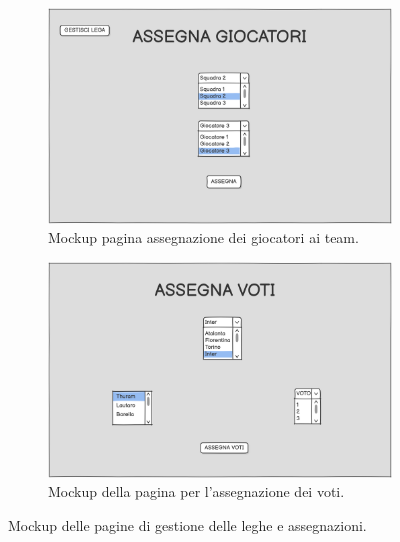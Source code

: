 \begin{figure}[H]
    \begin{subfigure}[b]{0.49\textwidth}
        \centering
        \includegraphics[width=\textwidth]{Resources/Mockups/AssegnaGiocatori.png}
        \caption{Mockup pagina assegnazione dei giocatori ai team.}
        \label{fig:pagina_assegna_giocatori}
    \end{subfigure}
    \hfill
    \begin{subfigure}[b]{0.49\textwidth}
        \centering
        \includegraphics[width=\textwidth]{Resources/Mockups/AssegnaVoti.png}
        \caption{Mockup della pagina per l'assegnazione dei voti.}
        \label{fig:pagina_assegna_voti}
    \end{subfigure}

    \caption{Mockup delle pagine di gestione delle leghe e assegnazioni.}
    \label{fig:mockup_parte4}
\end{figure}

